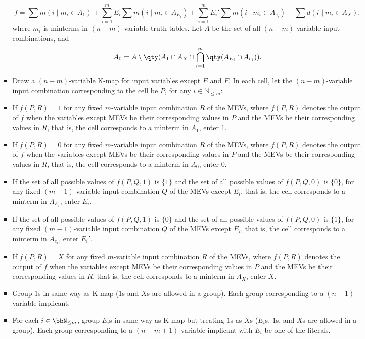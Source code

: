 \documentclass[a4paper,12pt]{article}
\begin{document}
\begin{itemize}
\begin{itemize}
\begin{itemize}
\begin{itemize}
\begin{itemize}
\begin{itemize}
\begin{itemize}
\[f=\sum m(i\mid m_i\in A_1)+\sum_{i=1}^mE_i\sum m(i\mid m_i\in A_{E_i})+\sum_{i=1}^mE_i'\sum m(i\mid m_i\in A_{e_i})+\sum d(i\mid m_i\in A_X),\]
where $m_i$ is minterms in $(n-m)$-variable truth tables. Let $A$ be the set of all $(n-m)$-variable input combinations, and
\[A_0=A\setminus\qty(A_1\cap A_X\cap\bigcap_{i=1}^m\qty(A_{E_i}\cap A_{e_i})).\]
\ben
\item Draw a $(n-m)$-variable K-map for input variables except $E$ and $F$. In each cell, let the $(n-m)$-variable input combination corresponding to the cell be $P$, for any $i\in\mathbb{N}_{\leq m}$:
\bit
\item If $f(P,R)=1$ for any fixed $m$-variable input combination $R$ of the MEVs, where $f(P,R)$ denotes the output of $f$ when the variables except MEVs be their corresponding values in $P$ and the MEVs be their corresponding values in $R$, that is, the cell corresponds to a minterm in $A_1$, enter $1$.
\item If $f(P,R)=0$ for any fixed $m$-variable input combination $R$ of the MEVs, where $f(P,R)$ denotes the output of $f$ when the variables except MEVs be their corresponding values in $P$ and the MEVs be their corresponding values in $R$, that is, the cell corresponds to a minterm in $A_0$, enter $0$.
\item If the set of all possible values of $f(P,Q,1)$ is $\{1\}$ and the set of all possible values of $f(P,Q,0)$ is $\{0\}$, for any fixed $(m-1)$-variable input combination $Q$ of the MEVs except $E_i$, that is, the cell corresponds to a minterm in $A_{E_i}$, enter $E_i$.
\item If the set of all possible values of $f(P,Q,1)$ is $\{0\}$ and the set of all possible values of $f(P,Q,0)$ is $\{1\}$, for any fixed $(m-1)$-variable input combination $Q$ of the MEVs except $E_i$, that is, the cell corresponds to a minterm in $A_{e_i}$, enter $E_i'$.
\item If $f(P,R)=X$ for any fixed $m$-variable input combination $R$ of the MEVs, where $f(P,R)$ denotes the output of $f$ when the variables except MEVs be their corresponding values in $P$ and the MEVs be their corresponding values in $R$, that is, the cell corresponds to a minterm in $A_X$, enter $X$.
\eit
\item Group $1$s in same way as K-map ($1$s and $X$s are allowed in a group). Each group corresponding to a $(n-1)$-variable implicant.
\item For each $i\in\bbN_{\leq m}$, group $E_i$s in same way as K-map but treating $1$s as $X$s ($E_i$s, $1$s, and $X$s are allowed in a group). Each group corresponding to a $(n-m+1)$-variable implicant with $E_i$ be one of the literals.

\end{itemize}
\end{itemize}
\end{itemize}
\end{itemize}
\end{itemize}
\end{itemize}
\end{itemize}
\end{document}
